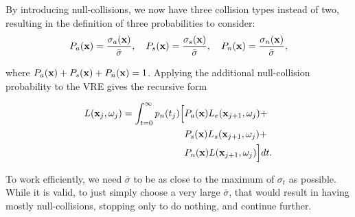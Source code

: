 By introducing null-collisions, we now have three collision types instead of two, resulting in the definition of three probabilities to consider:
$$
P_a(\textbf{x}) = \frac{\sigma_a(\textbf{x})}{\bar\sigma},~~~ 
P_s(\textbf{x}) = \frac{\sigma_s(\textbf{x})}{\bar\sigma},~~~
P_n(\textbf{x}) = \frac{\sigma_n(\textbf{x})}{\bar\sigma},
$$

\noindent where $P_a(\textbf{x}) + P_s(\textbf{x}) + P_n(\textbf{x}) = 1$. Applying the additional null-collision probability to the VRE gives the recursive form

\begin{align}
\begin{aligned}
    L(\textbf{x}_j, \omega_j) = \int_{t=0}^\infty 
    p_n(t_j)\Big[
        &P_a(\textbf{x}) L_e(\textbf{x}_{j+1}, \omega_j) +\\
        &P_s(\textbf{x}) L_s(\textbf{x}_{j+1}, \omega_j) +\\
        &P_n(\textbf{x}) L(\textbf{x}_{j+1}, \omega_j)
    \Big]dt.
\end{aligned}
\end{align}

To work efficiently, we need $\bar\sigma$ to be as close to the maximum of $\sigma_t$ as possible. While it is valid, to just simply choose a very large $\bar\sigma$, that would result in having mostly null-collisions, stopping only to do nothing, and continue further.



